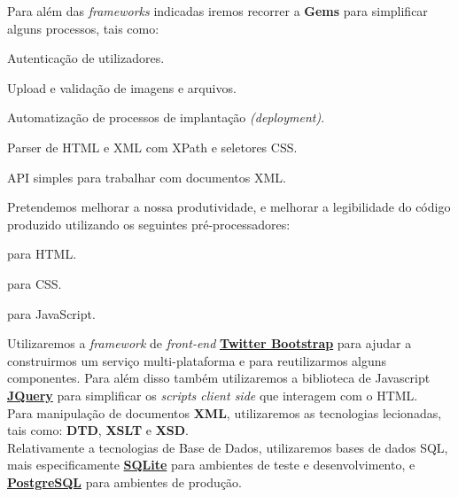 Para além das \textit{frameworks} indicadas iremos recorrer a \textbf{Gems} para simplificar alguns processos, tais como:

\begin{description}[labelindent=1cm]
  \item[Devise] Autenticação de utilizadores.
  \item[Paperclip] Upload e validação de imagens e arquivos.
  \item[Capistrano] Automatização de processos de implantação \textit{(deployment)}.
  \item[Nokogiri] Parser de HTML e XML com XPath e seletores CSS.
  \item[XML-Simple] API simples para trabalhar com documentos XML.
\end{description} 

Pretendemos melhorar a nossa produtividade, e melhorar a legibilidade do código produzido utilizando os seguintes pré-processadores:

\begin{description}[labelindent=1cm]
  \item[\href{http://slim-lang.com/}{Slim}] para HTML.
  \item[\href{http://sass-lang.com/}{SASS}] para CSS.
  \item[\href{http://coffeescript.org/}{CoffeeScript}] para JavaScript.
\end{description} 

Utilizaremos a \textit{framework} de \textit{front-end} \href{http://getbootstrap.com/}{\textbf{Twitter Bootstrap}} 
para ajudar a construirmos um serviço multi-plataforma e para reutilizarmos alguns componentes.
Para além disso também utilizaremos a biblioteca de Javascript \href{http://jquery.com/}{\textbf{JQuery}} para simplificar os \textit{scripts client side} que interagem com o HTML.\\

Para manipulação de documentos \textbf{XML}, utilizaremos as tecnologias lecionadas, tais como: \textbf{DTD}, \textbf{XSLT} e \textbf{XSD}.\\

Relativamente a tecnologias de Base de Dados, utilizaremos bases de dados SQL, mais especificamente \href{http://www.sqlite.org/}{\textbf{SQLite}} 
para ambientes de teste e desenvolvimento, e \href{http://www.postgresql.org/}{\textbf{PostgreSQL}} para ambientes de produção.

\newpage
